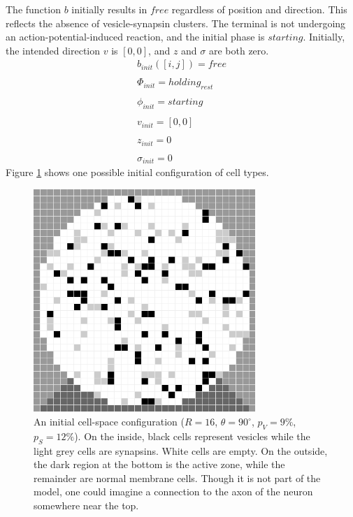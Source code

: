 \documentclass{acm_proc_article-sp}
\begin{document}
The function $b$ initially results in $free$ regardless of position and
direction.  This reflects the absence of vesicle-synapsin clusters.  
The terminal is not undergoing an action-potential-induced reaction, 
and the initial phase is $starting$.
Initially, the intended direction $v$ is $[0, 0]$, and $z$ and $\sigma$
are both zero.
\begin{displaymath} \begin{array}{l}
b_{init}([i, j]) = free \\
\\
\Phi_{init} = holding_{rest} \\
\\
\phi_{init} = starting \\
\\
v_{init} = [0,0] \\
\\
z_{init} = 0 \\
\\
\sigma_{init} = 0
\end{array} \end{displaymath}
Figure \ref{fig:Initial} shows one possible initial configuration of cell 
types.  
\\
\begin{figure}[ht]
\centering
\includegraphics[width=84mm]{VS_Test_0001.png}
\caption{An initial cell-space configuration ($R = 16$, 
$\theta = 90^\circ$, $p_V = 9\%$, $p_S = 12\%$).  On the 
inside, black cells represent vesicles while the light grey 
cells are synapsins.  White cells are empty.  On the 
outside, the dark region at the bottom is the active zone, 
while the remainder are normal membrane cells.  Though it
is not part of the model, one could imagine a connection
to the axon of the neuron somewhere near the top. }
\label{fig:Initial}
\end{figure}
\\
\end{document}
